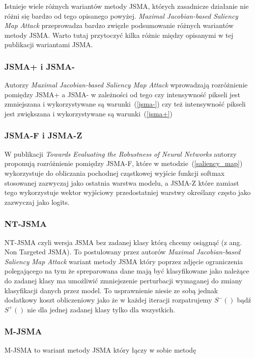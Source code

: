 \documentclass[
    left=2.5cm,         %
    right=2.5cm,        %
    top=2.5cm,          %
    bottom=3cm,         %
    bindingoffset=6mm,  %
    nohyphenation=false %
]{eiti/eiti-thesis}
\begin{document}
Istnieje wiele różnych wariantów metody JSMA, których zasadnicze działanie nie różni się bardzo od tego opisanego powyżej.
\textit{Maximal Jacobian-based Saliency Map Attack}\cite{DBLP:journals/corr/abs-1808-07945} przeprowadza bardzo
zwięzłe podsumowanie różnych wariantów metody JSMA. Warto tutaj przytoczyć kilka różnic między opisanymi w tej publikacji
wariantami JSMA.

\subsubsection{JSMA+ i JSMA-}
Autorzy \textit{Maximal Jacobian-based Saliency Map Attack}\cite{DBLP:journals/corr/abs-1808-07945} wprowadzają rozróżnienie
pomiędzy JSMA+ a JSMA- w zależności od tego czy intensywność pikseli jest zmniejszana i wykorzystywane są warunki~(\ref{jsma-})
czy też intensywność pikseli jest zwiększana i wykorzystywane są warunki~(\ref{jsma+})

\subsubsection{JSMA-F i JSMA-Z}
W publikacji \textit{Towards Evaluating the Robustness of Neural Networks}\cite{DBLP:journals/corr/CarliniW16a}
autorzy proponują rozróżnienie pomiędzy JSMA-F, które w metodzie~(\ref{saliency_map}) wykorzystuje do obliczania pochodnej cząstkowej
wyjście funkcji softmax stosowanej zazwyczaj jako ostatnia warstwa modelu, a JSMA-Z które zamiast tego wykorzystuje wektor
wyjściowy przedostatniej warstwy określany często jako zazwyczaj jako logits.

\subsubsection{NT-JSMA}
NT-JSMA czyli wersja JSMA bez zadanej klasy którą chcemy osiągnąć (z ang. Non Targeted JSMA). To postulowany przez autorów
\textit{Maximal Jacobian-based Saliency Map Attack}\cite{DBLP:journals/corr/abs-1808-07945} wariant metody JSMA
który poprzez zdjęcie ograniczenia polegającego na tym że spreparowana dane mają być klasyfikowane jako należące do zadanej
klasy ma umożliwić zmniejszenie perturbacji wymaganej do zmiany klasyfikacji danych przez model. To usprawnienie niesie
ze sobą jednak dodatkowy koszt obliczeniowy jako że w każdej iteracji rozpatrujemy $S^{-}()$ bądź $S^{+}()$ nie dla
jednej zadanej klasy tylko dla wszystkich.

\subsubsection{M-JSMA}
M-JSMA\cite{DBLP:journals/corr/abs-1808-07945} to wariant metody JSMA który łączy w sobie metodę
\end{document}
